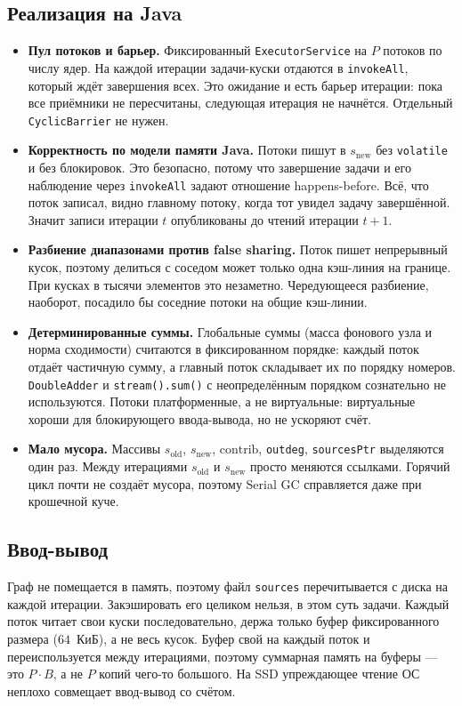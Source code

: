 \subsection{Реализация на Java}
\label{sec:java}
\begin{itemize}[itemsep=3pt]
  \item \textbf{Пул потоков и барьер.} Фиксированный \texttt{ExecutorService} на $P$ потоков по числу
        ядер. На каждой итерации задачи-куски отдаются в \texttt{invokeAll}, который ждёт завершения
        всех. Это ожидание и есть барьер итерации: пока все приёмники не пересчитаны, следующая
        итерация не начнётся. Отдельный \texttt{CyclicBarrier} не нужен.
  \item \textbf{Корректность по модели памяти Java.} Потоки пишут в $s_{\mathrm{new}}$ без
        \texttt{volatile} и без блокировок. Это безопасно, потому что завершение задачи и его
        наблюдение через \texttt{invokeAll} задают отношение happens-before. Всё, что поток записал,
        видно главному потоку, когда тот увидел задачу завершённой. Значит записи итерации $t$
        опубликованы до чтений итерации $t{+}1$.
  \item \textbf{Разбиение диапазонами против false sharing.} Поток пишет непрерывный кусок, поэтому
        делиться с соседом может только одна кэш-линия на границе. При кусках в тысячи элементов это
        незаметно. Чередующееся разбиение, наоборот, посадило бы соседние потоки на общие кэш-линии.
  \item \textbf{Детерминированные суммы.} Глобальные суммы (масса фонового узла и норма сходимости)
        считаются в фиксированном порядке: каждый поток отдаёт частичную сумму, а главный поток
        складывает их по порядку номеров. \texttt{DoubleAdder} и \texttt{stream().sum()} с
        неопределённым порядком сознательно не используются. Потоки платформенные, а не виртуальные:
        виртуальные хороши для блокирующего ввода-вывода, но не ускоряют счёт.
  \item \textbf{Мало мусора.} Массивы $s_{\mathrm{old}}$, $s_{\mathrm{new}}$, $\mathrm{contrib}$,
        \texttt{outdeg}, \texttt{sourcesPtr} выделяются один раз. Между итерациями $s_{\mathrm{old}}$
        и $s_{\mathrm{new}}$ просто меняются ссылками. Горячий цикл почти не создаёт мусора, поэтому
        Serial GC справляется даже при крошечной куче.
\end{itemize}

\subsection{Ввод-вывод}
Граф не помещается в память, поэтому файл \texttt{sources} перечитывается с диска на каждой итерации.
Закэшировать его целиком нельзя, в этом суть задачи. Каждый поток читает свои куски последовательно,
держа только буфер фиксированного размера ($64$~КиБ), а не весь кусок. Буфер свой на каждый поток и
переиспользуется между итерациями, поэтому суммарная память на буферы --- это $P\cdot B$, а не $P$
копий чего-то большого. На SSD упреждающее чтение ОС неплохо совмещает ввод-вывод со счётом.
